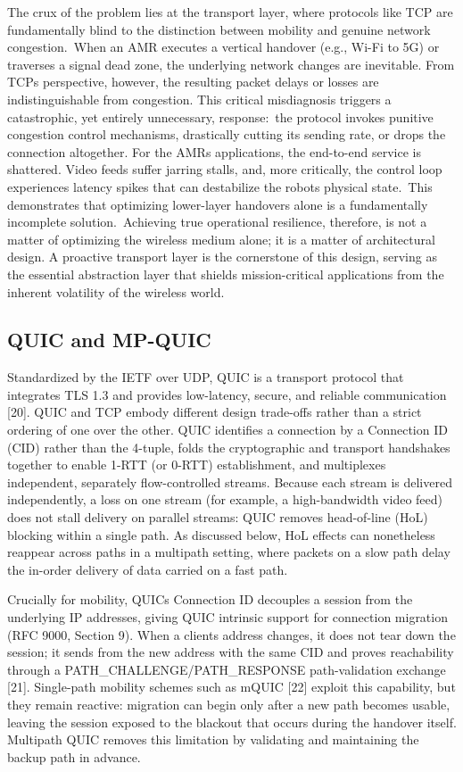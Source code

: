 \documentclass[preprint,11pt]{elsarticle}
\begin{document}
The crux of the problem lies at the transport layer, where protocols like TCP are fundamentally blind to the distinction between mobility and genuine network congestion.~When an AMR executes a vertical handover (e.g., Wi-Fi to 5G) or traverses a signal dead zone, the underlying network changes are inevitable. From TCP\textquotesingle s perspective, however, the resulting packet delays or losses are indistinguishable from congestion. This critical misdiagnosis triggers a catastrophic, yet entirely unnecessary, response:~the protocol invokes punitive congestion control mechanisms, drastically cutting its sending rate, or drops the connection altogether. For the AMR\textquotesingle s applications, the end-to-end service is shattered. Video feeds suffer jarring stalls, and, more critically, the control loop experiences latency spikes that can destabilize the robot\textquotesingle s physical state.~This demonstrates that optimizing lower-layer handovers alone is a fundamentally incomplete solution.~Achieving true operational resilience, therefore, is not a matter of optimizing the wireless medium alone; it is a matter of architectural design. A proactive transport layer is the cornerstone of this design, serving as the essential abstraction layer that shields mission-critical applications from the inherent volatility of the wireless world.
\subsection{QUIC and MP-QUIC}
Standardized by the IETF over UDP, QUIC is a transport protocol that integrates TLS 1.3 and provides low-latency, secure, and reliable communication [20]. QUIC and TCP embody different design trade-offs rather than a strict ordering of one over the other. QUIC identifies a connection by a Connection ID (CID) rather than the 4-tuple, folds the cryptographic and transport handshakes together to enable 1-RTT (or 0-RTT) establishment, and multiplexes independent, separately flow-controlled streams. Because each stream is delivered independently, a loss on one stream (for example, a high-bandwidth video feed) does not stall delivery on parallel streams: QUIC removes head-of-line (HoL) blocking within a single path. As discussed below, HoL effects can nonetheless reappear across paths in a multipath setting, where packets on a slow path delay the in-order delivery of data carried on a fast path.

Crucially for mobility, QUIC\textquotesingle s Connection ID decouples a session from the underlying IP addresses, giving QUIC intrinsic support for connection migration (RFC 9000, Section 9). When a client\textquotesingle s address changes, it does not tear down the session; it sends from the new address with the same CID and proves reachability through a PATH\_CHALLENGE/PATH\_RESPONSE path-validation exchange [21]. Single-path mobility schemes such as mQUIC [22] exploit this capability, but they remain reactive: migration can begin only after a new path becomes usable, leaving the session exposed to the blackout that occurs during the handover itself. Multipath QUIC removes this limitation by validating and maintaining the backup path in advance.
\end{document}
